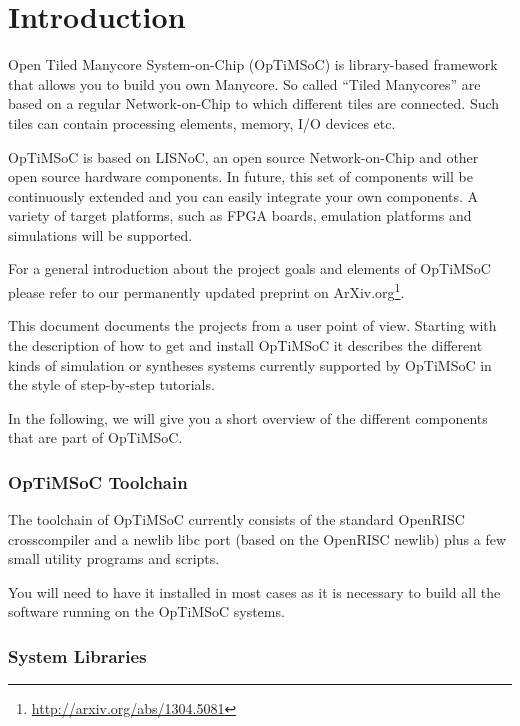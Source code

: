 \chapter{Introduction}
\label{chap:introduction}

Open Tiled Manycore System-on-Chip (OpTiMSoC) is library-based
framework that allows you to build you own Manycore. So called ``Tiled
Manycores'' are based on a regular Network-on-Chip to which different
tiles are connected. Such tiles can contain processing elements,
memory, I/O devices etc.

OpTiMSoC is based on LISNoC, an open source Network-on-Chip and other
open source hardware components. In future, this set of components
will be continuously extended and you can easily integrate your own
components. A variety of target platforms, such as FPGA boards,
emulation platforms and simulations will be supported.

For a general introduction about the project goals and elements of
OpTiMSoC please refer to our permanently updated preprint on
ArXiv.org\footnote{\url{http://arxiv.org/abs/1304.5081}}.

\medskip

This document documents the projects from a user point of view.
Starting with the description of how to get and install OpTiMSoC it
describes the different kinds of simulation or syntheses systems
currently supported by OpTiMSoC in the style of step-by-step
tutorials.

In the following, we will give you a short overview of the different
components that are part of OpTiMSoC. 

\subsection*{OpTiMSoC Toolchain}

The toolchain of OpTiMSoC currently consists of the standard OpenRISC
crosscompiler and a newlib libc port (based on the OpenRISC newlib)
plus a few small utility programs and scripts.

You will need to have it installed in most cases as it is necessary to
build all the software running on the OpTiMSoC systems.  

\subsection*{System Libraries}

